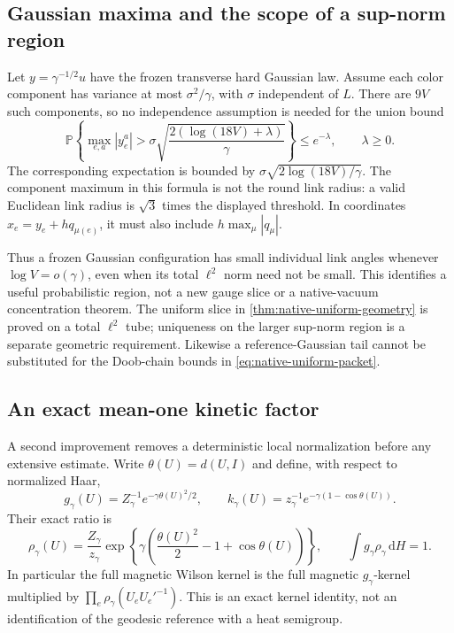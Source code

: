 \documentclass[11pt,oneside,openany]{book}
\theoremstyle{definition}
\theoremstyle{remark}
\newcommand{\dd}{\mathrm d}
\begin{document}
\subsection{Gaussian maxima and the scope of a sup-norm region}
\label{sec:native-Gaussian-maxima}
Let $y=\gamma^{-1/2}u$ have the frozen transverse hard Gaussian law.
Assume each color component has variance at most $\sigma^2/\gamma$,
with $\sigma$ independent of $L$. There are $9V$ such components, so
no independence assumption is needed for the union bound
\begin{equation}
 \mathbb P\left\{\max_{e,a}|y_e^a|>
 \sigma\sqrt{\frac{2(\log(18V)+\lambda)}\gamma}\right\}
 \le e^{-\lambda},\qquad \lambda\ge0.
 \label{eq:native-Gaussian-maximum}
\end{equation}
The corresponding expectation is bounded by
$\sigma\sqrt{2\log(18V)/\gamma}$. The component maximum in this
formula is not the round link radius: a valid Euclidean link radius
is $\sqrt3$ times the displayed threshold. In coordinates
$x_e=y_e+hq_{\mu(e)}$, it must also include
$h\max_\mu|q_\mu|$.

Thus a frozen Gaussian configuration has small individual link angles
whenever $\log V=o(\gamma)$, even when its total $\ell^2$ norm need
not be small. This identifies a useful probabilistic region, not a
new gauge slice or a native-vacuum concentration theorem. The uniform
slice in \cref{thm:native-uniform-geometry} is proved on a total
$\ell^2$ tube; uniqueness on the larger sup-norm region is a separate
geometric requirement. Likewise a reference-Gaussian tail cannot be
substituted for the Doob-chain bounds in
\cref{eq:native-uniform-packet}.

\subsection{An exact mean-one kinetic factor}
\label{sec:native-mean-one}
A second improvement removes a deterministic local normalization
before any extensive estimate. Write $\theta(U)=d(U,I)$ and define,
with respect to normalized Haar,
\begin{equation}
 g_\gamma(U)=Z_\gamma^{-1}e^{-\gamma\theta(U)^2/2},\qquad
 k_\gamma(U)=z_\gamma^{-1}e^{-\gamma(1-\cos\theta(U))}.
 \label{eq:native-geodesic-reference}
\end{equation}
Their exact ratio is
\begin{equation}
 \rho_\gamma(U)=\frac{Z_\gamma}{z_\gamma}
 \exp\left\{\gamma\left(\frac{\theta(U)^2}2-1+
                                      \cos\theta(U)\right)\right\},
 \qquad \int g_\gamma\rho_\gamma\,\dd H=1.
 \label{eq:native-mean-one-ratio}
\end{equation}
In particular the full magnetic Wilson kernel is the full magnetic
$g_\gamma$-kernel multiplied by
$\prod_e\rho_\gamma(U_eU_e'^{-1})$. This is an exact kernel identity,
not an identification of the geodesic reference with a heat semigroup.
\end{document}
